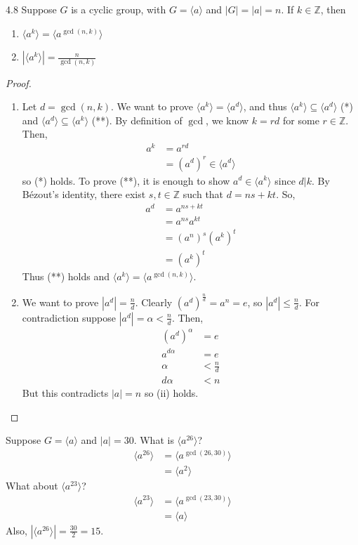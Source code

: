 \documentclass[12pt]{article}
\newcommand{\Z}{\mathbb{Z}}
\begin{document}
	\begin{mythm}{}{4.8}
		Suppose $G$ is a cyclic group, with $G=\langle a\rangle$ and $|G|=|a|=n$. If $k\in\Z$, then
		\begin{enumerate}[label=(\roman*)]
			\item $\langle a^k\rangle=\langle a^{\gcd(n, k)}\rangle$
			\item $|\langle a^k\rangle|=\frac{n}{\gcd(n, k)}$
		\end{enumerate}
		\begin{proof}~\\
			\begin{enumerate}[label=(\roman*)]
				\item Let $d=\gcd(n, k)$. We want to prove $\langle a^k\rangle=\langle a^d\rangle$, and thus $\langle a^k\rangle\subseteq\langle a^d\rangle$ (*) and $\langle a^d\rangle\subseteq\langle a^k\rangle$ (**). By definition of $\gcd$, we know $k=rd$ for some $r\in\Z$. Then,
				\begin{align*}
					a^k&=a^{rd}\\
					&=(a^d)^r\in\langle a^d\rangle
				\end{align*}
				so (*) holds. To prove (**), it is enough to show $a^d\in\langle a^k\rangle$ since $d|k$. By B\'ezout's identity, there exist $s, t\in\Z$ such that $d=ns+kt$. So,
				\begin{align*}
					a^d&=a^{ns+kt}\\
					&=a^{ns}a^{kt}\\
					&=(a^n)^s(a^k)^t\\
					&=(a^k)^t
				\end{align*}
				Thus (**) holds and $\langle a^k\rangle=\langle a^{\gcd(n, k)}\rangle$.
				
				\item We want to prove $|a^d|=\frac{n}{d}$. Clearly $(a^d)^{\frac{n}{d}}=a^n=e$, so $|a^d|\leq\frac{n}{d}$. For contradiction suppose $|a^d|=\alpha<\frac{n}{d}$. Then,
				\begin{align*}
					(a^d)^\alpha&=e\\
					a^{d\alpha}&=e\\
					\alpha&<\frac{n}{d}\\
					d\alpha&<n
				\end{align*}
				But this contradicts $|a|=n$ so (ii) holds.
			\end{enumerate}
		\end{proof}
	\end{mythm}
	
	\begin{myex}{}{}
		Suppose $G=\langle a\rangle$ and $|a|=30$. What is $\langle a^{26}\rangle$?
		\begin{align*}
			\langle a^{26}\rangle&=\langle a^{\gcd(26, 30)}\rangle\\
			&=\langle a^2\rangle
		\end{align*}
		What about $\langle a^{23}\rangle$?
		\begin{align*}
			\langle a^{23}\rangle&=\langle a^{\gcd(23, 30)}\rangle\\
			&=\langle a\rangle
		\end{align*}
		Also, $|\langle a^{26}\rangle|=\frac{30}{2}=15$.
	\end{myex}
	
\end{document}
